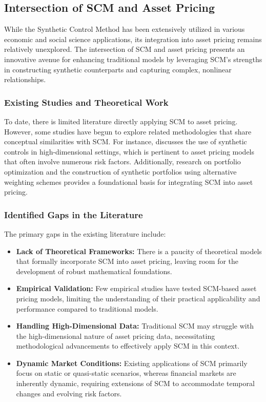 \subsection{Intersection of SCM and Asset Pricing}

While the Synthetic Control Method has been extensively utilized in various economic and social science applications, its integration into asset pricing remains relatively unexplored. The intersection of SCM and asset pricing presents an innovative avenue for enhancing traditional models by leveraging SCM's strengths in constructing synthetic counterparts and capturing complex, nonlinear relationships.

\subsubsection{Existing Studies and Theoretical Work}
To date, there is limited literature directly applying SCM to asset pricing. However, some studies have begun to explore related methodologies that share conceptual similarities with SCM. For instance, \cite{Chernozhukov2018} discusses the use of synthetic controls in high-dimensional settings, which is pertinent to asset pricing models that often involve numerous risk factors. Additionally, research on portfolio optimization and the construction of synthetic portfolios using alternative weighting schemes \cite{Jensen1968, Merton1969} provides a foundational basis for integrating SCM into asset pricing.

\subsubsection{Identified Gaps in the Literature}
The primary gaps in the existing literature include:
\begin{itemize}
    \item \textbf{Lack of Theoretical Frameworks:} There is a paucity of theoretical models that formally incorporate SCM into asset pricing, leaving room for the development of robust mathematical foundations.
    \item \textbf{Empirical Validation:} Few empirical studies have tested SCM-based asset pricing models, limiting the understanding of their practical applicability and performance compared to traditional models.
    \item \textbf{Handling High-Dimensional Data:} Traditional SCM may struggle with the high-dimensional nature of asset pricing data, necessitating methodological advancements to effectively apply SCM in this context.
    \item \textbf{Dynamic Market Conditions:} Existing applications of SCM primarily focus on static or quasi-static scenarios, whereas financial markets are inherently dynamic, requiring extensions of SCM to accommodate temporal changes and evolving risk factors.
\end{itemize}

